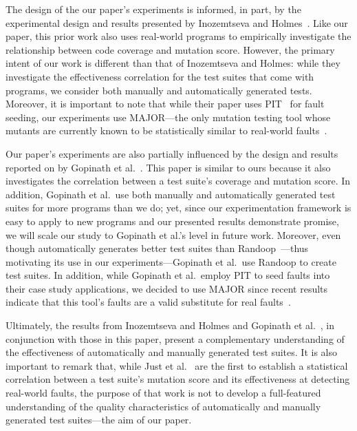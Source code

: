 The design of the our paper's experiments is informed, in part, by the experimental design and results presented by Inozemtseva and Holmes~\cite{inozemtseva2014}. Like our paper, this prior work also uses real-world programs to empirically investigate the relationship between code coverage and mutation score. However, the primary intent of our work is different than that of Inozemtseva and Holmes: while they investigate the effectiveness correlation for the test suites that come with programs, we consider both manually and automatically generated tests. Moreover, it is important to note that while their paper uses PIT~\cite{pit2014} for fault seeding, our experiments use MAJOR---the only mutation testing tool whose mutants are currently known to be statistically similar to real-world faults~\cite{just2014}.

Our paper's experiments are also partially influenced by the design and results reported on by Gopinath et al.~\cite{gopinath2014}.  This paper is similar to ours because it also investigates the correlation between a test suite's coverage and mutation score.  In addition, Gopinath et al.\ use both manually and automatically generated test suites for more programs than we do; yet, since our experimentation framework is easy to apply to new programs and our presented results demonstrate promise, we will scale our study to Gopinath et al.'s level in future work. Moreover, even though \evo automatically generates better test suites than Randoop~\cite{fraser2013a}---thus motivating its use in our experiments---Gopinath et al.\ use Randoop to create test suites.  In addition, while Gopinath et al.\ employ PIT to seed faults into their case study applications, we decided to use MAJOR since recent results indicate that this tool's faults are a valid substitute for real faults~\cite{just2014}. 

Ultimately, the results from Inozemtseva and Holmes \cite{inozemtseva2014} and Gopinath et al.~\cite{gopinath2014}, in conjunction with those in this paper, present a complementary understanding of the effectiveness of automatically and manually generated test suites. It is also important to remark that, while Just et al.~\cite{just2014} are the first to establish a statistical correlation between a test suite's mutation score and its effectiveness at detecting real-world faults, the purpose of that work is not to develop a full-featured understanding of the quality characteristics of automatically and manually generated test suites---the aim of our paper.

